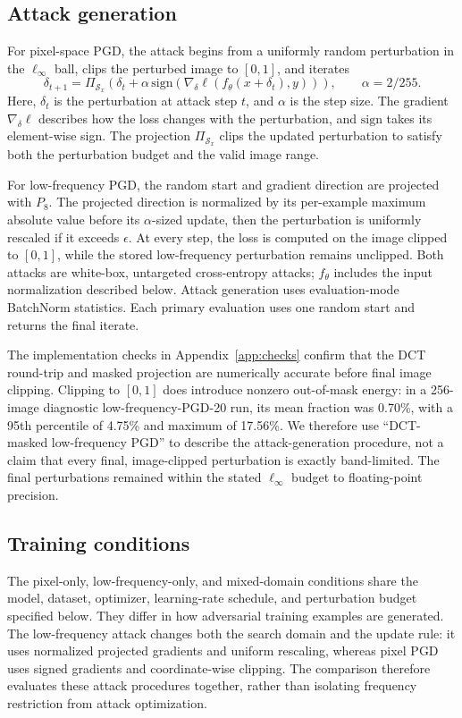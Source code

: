 \documentclass[11pt]{article}
\newcommand{\linf}{\ell_\infty}
\begin{document}
\subsection{Attack generation}
\label{sec:attacks}
For pixel-space PGD, the attack begins from a uniformly random perturbation in
the $\linf$ ball, clips the perturbed image to $[0,1]$, and iterates
\begin{equation}
  \delta_{t+1}=\Pi_{\mathcal{S}_x}
  \left(\delta_t+\alpha\,\mathrm{sign}\left(\nabla_\delta
  \ell(f_\theta(x+\delta_t),y)\right)\right),
  \qquad \alpha=2/255.
  \label{eq:pixel-pgd}
\end{equation}
Here, $\delta_t$ is the perturbation at attack step $t$, and $\alpha$ is the
step size. The gradient $\nabla_\delta\ell$ describes how the loss changes
with the perturbation, and $\mathrm{sign}$ takes its element-wise sign. The
projection $\Pi_{\mathcal{S}_x}$ clips the updated perturbation to satisfy
both the perturbation budget and the valid image range.

For low-frequency PGD, the random start and gradient direction are projected
with $P_8$. The projected direction is normalized by its per-example maximum
absolute value before its $\alpha$-sized update, then the perturbation is
uniformly rescaled if it exceeds $\epsilon$. At every step, the loss is
computed on the image clipped to $[0,1]$, while the stored low-frequency
perturbation remains unclipped. Both attacks are white-box, untargeted
cross-entropy attacks; $f_\theta$ includes the input normalization described
below. Attack generation uses evaluation-mode BatchNorm statistics.
Each primary evaluation uses one random start and returns the final iterate.

The implementation checks in Appendix~\ref{app:checks} confirm that the DCT
round-trip and masked projection are numerically accurate before final image
clipping. Clipping to $[0,1]$ does introduce nonzero out-of-mask energy: in a
256-image diagnostic low-frequency-PGD-20 run, its mean fraction was 0.70\%,
with a 95th percentile of 4.75\% and maximum of 17.56\%. We therefore use
``DCT-masked low-frequency PGD'' to describe the attack-generation procedure,
not a claim that every final, image-clipped perturbation is exactly
band-limited. The final perturbations remained within the stated $\linf$
budget to floating-point precision.

\subsection{Training conditions}
\label{sec:conditions}
The pixel-only, low-frequency-only, and mixed-domain conditions share the
model, dataset, optimizer, learning-rate schedule, and perturbation budget
specified below. They differ in how adversarial training examples are
generated. The low-frequency attack changes both the search domain and the
update rule: it uses normalized projected gradients and uniform rescaling,
whereas pixel PGD uses signed gradients and coordinate-wise clipping. The
comparison therefore evaluates these attack procedures together, rather than
isolating frequency restriction from attack optimization.
\end{document}
